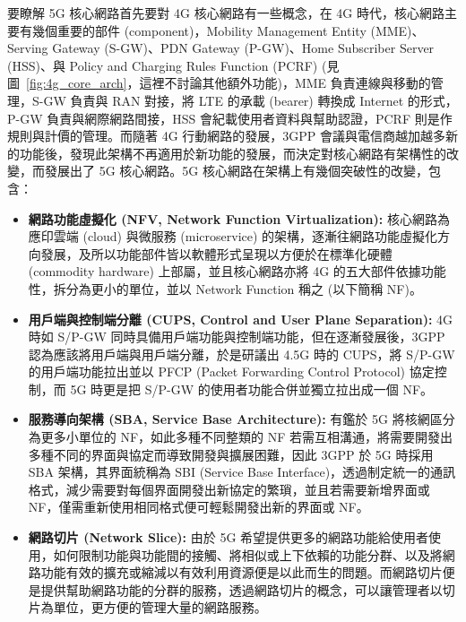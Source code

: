 要瞭解 5G 核心網路首先要對 4G 核心網路有一些概念，在 4G 時代，核心網路主要有幾個重要的部件 (component)，Mobility Management Entity (MME)、Serving Gateway (S-GW)、PDN Gateway (P-GW)、Home Subscriber Server (HSS)、與 Policy and Charging Rules Function (PCRF) (見圖~\ref{fig:4g_core_arch}，這裡不討論其他額外功能)，MME 負責連線與移動的管理，S-GW 負責與 RAN 對接，將 LTE 的承載 (bearer) 轉換成 Internet 的形式，P-GW 負責與網際網路間接，HSS 會紀載使用者資料與幫助認證，PCRF 則是作規則與計價的管理。而隨著 4G 行動網路的發展，3GPP 會議與電信商越加越多新的功能後，發現此架構不再適用於新功能的發展，而決定對核心網路有架構性的改變，而發展出了 5G 核心網路。5G 核心網路在架構上有幾個突破性的改變，包含：
\begin{itemize}
\item \textbf{網路功能虛擬化 (NFV, Network Function Virtualization):} 核心網路為應印雲端 (cloud) 與微服務 (microservice) 的架構，逐漸往網路功能虛擬化方向發展，及所以功能部件皆以軟體形式呈現以方便於在標準化硬體 (commodity hardware) 上部屬，並且核心網路亦將 4G 的五大部件依據功能性，拆分為更小的單位，並以 Network Function 稱之 (以下簡稱 NF)。
\item \textbf{用戶端與控制端分離 (CUPS, Control and User Plane Separation):} 4G 時如 S/P-GW 同時具備用戶端功能與控制端功能，但在逐漸發展後，3GPP 認為應該將用戶端與用戶端分離，於是研議出 4.5G 時的 CUPS，將 S/P-GW 的用戶端功能拉出並以 PFCP (Packet Forwarding Control Protocol) 協定控制，而 5G 時更是把 S/P-GW 的使用者功能合併並獨立拉出成一個 NF。
\item \textbf{服務導向架構 (SBA, Service Base Architecture):} 有鑑於 5G 將核網區分為更多小單位的 NF，如此多種不同整類的 NF 若需互相溝通，將需要開發出多種不同的界面與協定而導致開發與擴展困難，因此 3GPP 於 5G 時採用 SBA 架構，其界面統稱為 SBI (Service Base Interface)，透過制定統一的通訊格式，減少需要對每個界面開發出新協定的繁瑣，並且若需要新增界面或 NF，僅需重新使用相同格式便可輕鬆開發出新的界面或 NF。
\item \textbf{網路切片 (Network Slice):} 由於 5G 希望提供更多的網路功能給使用者使用，如何限制功能與功能間的接觸、將相似或上下依賴的功能分群、以及將網路功能有效的擴充或縮減以有效利用資源便是以此而生的問題。而網路切片便是提供幫助網路功能的分群的服務，透過網路切片的概念，可以讓管理者以切片為單位，更方便的管理大量的網路服務。
\end{itemize}

